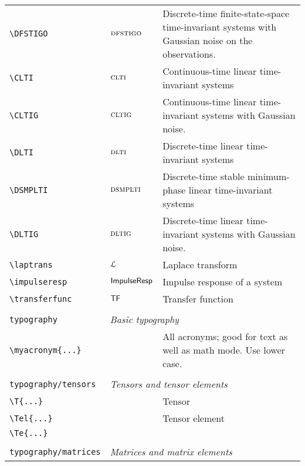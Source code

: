 \begin{longtable}{lll}
 {\color[rgb]{0.5,0.5,0.5}\texttt{\textbackslash DFSTIGO}} & $\textsc{dfstigo}$ &  Discrete-time finite-state-space time-invariant systems with Gaussian noise on the observations.\\ 
 {\color[rgb]{0.5,0.5,0.5}\texttt{\textbackslash CLTI}} & $\textsc{clti}$ &  Continuous-time linear time-invariant systems\\ 
 {\color[rgb]{0.5,0.5,0.5}\texttt{\textbackslash CLTIG}} & $\textsc{cltig}$ &  Continuous-time linear time-invariant systems with Gaussian noise.\\ 
 {\color[rgb]{0.5,0.5,0.5}\texttt{\textbackslash DLTI}} & $\textsc{dlti}$ &  Discrete-time linear time-invariant systems\\ 
 {\color[rgb]{0.5,0.5,0.5}\texttt{\textbackslash DSMPLTI}} & $\textsc{dsmplti}$ &  Discrete-time stable minimum-phase linear time-invariant systems\\ 
 {\color[rgb]{0.5,0.5,0.5}\texttt{\textbackslash DLTIG}} & $\textsc{dltig}$ &  Discrete-time linear time-invariant systems with Gaussian noise.\\ 
 {\color[rgb]{0.5,0.5,0.5}\texttt{\textbackslash laptrans}} & $\mathcal{L}$ &  Laplace transform\\ 
 {\color[rgb]{0.5,0.5,0.5}\texttt{\textbackslash impulseresp}} & $\mathsf{ImpulseResp}$ &  Impulse response of a system\\ 
 {\color[rgb]{0.5,0.5,0.5}\texttt{\textbackslash transferfunc}} & $\mathsf{TF}$ &  Transfer function\\ 
  &  & \\ 
 {\color[rgb]{0.5,0.5,0.5}\texttt{typography}} & \multicolumn{2}{l}{\emph{Basic typography}}\\ 
 \hline
\hline
{\color[rgb]{0.5,0.5,0.5}\texttt{\textbackslash myacronym\{...\}}} &  &  All acronyms; good for text as well as math mode. Use lower case.\\ 
  &  & \\ 
 {\color[rgb]{0.5,0.5,0.5}\texttt{typography/tensors}} & \multicolumn{2}{l}{\emph{Tensors and tensor elements}}\\ 
 \hline
{\color[rgb]{0.5,0.5,0.5}\texttt{\textbackslash T\{...\}}} &  &  Tensor\\ 
 {\color[rgb]{0.5,0.5,0.5}\texttt{\textbackslash Tel\{...\}}} &  &  Tensor element\\ 
 {\color[rgb]{0.5,0.5,0.5}\texttt{\textbackslash Te\{...\}}} &  & \\ 
  &  & \\ 
 {\color[rgb]{0.5,0.5,0.5}\texttt{typography/matrices}} & \multicolumn{2}{l}{\emph{Matrices and matrix elements}}\\ 

\end{longtable}
